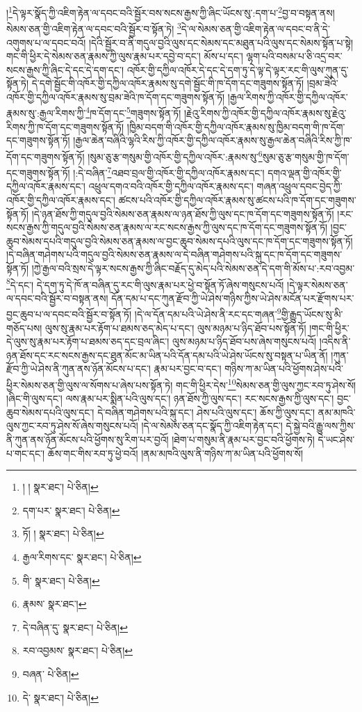 །\footnote{། །  སྣར་ཐང་།  པེ་ཅིན། }དེ་ལྟར་སྣོད་ཀྱི་འཇིག་རྟེན་ལ་དབང་བའི་སྦྱོར་བས་སངས་རྒྱས་ཀྱི་ཞིང་ཡོངས་སུ་:དག་པ་\footnote{དག་པར་  སྣར་ཐང་།  པེ་ཅིན། }བྱ་བ་བསྟན་ནས། སེམས་ཅན་གྱི་འཇིག་རྟེན་ལ་དབང་བའི་སྦྱོར་བ་སྟོན་ཏེ། \footnote{ཏོ། །   སྣར་ཐང་།  པེ་ཅིན། }དེ་ལ་སེམས་ཅན་གྱི་འཇིག་རྟེན་ལ་དབང་བ་ནི་དེ་འགུགས་པ་ལ་དབང་བའོ། །དེའི་སྦྱོར་བ་ནི་གདུལ་བྱའི་ལུས་དང་སེམས་དང་མཐུན་པའི་ལུས་དང་སེམས་སྟོན་པ་སྟེ། གང་གི་ཕྱིར་དེ་སེམས་ཅན་རྣམས་ཀྱི་ལུས་རྣམ་པར་དབྱེ་བ་དང་། མོས་པ་དང་། ལྷག་པའི་བསམ་པ་ཅི་འདྲ་བར་སངས་རྒྱས་ཀྱི་ཞིང་དེ་དང་དེ་དག་དང་། འཁོར་གྱི་དཀྱིལ་འཁོར་དེ་དང་དེ་དག་ཏུ་དེ་ལྟ་དེ་ལྟར་རང་གི་ལུས་ཀུན་དུ་སྟོན་ཏེ། དེ་དགེ་སྦྱོང་གི་འཁོར་གྱི་དཀྱིལ་འཁོར་རྣམས་སུ་དགེ་སྦྱོང་གི་ཁ་དོག་དང་གཟུགས་སྟོན་ཏོ། །བྲམ་ཟེའི་འཁོར་གྱི་དཀྱིལ་འཁོར་རྣམས་སུ་བྲམ་ཟེའི་ཁ་དོག་དང་གཟུགས་སྟོན་ཏོ། །རྒྱལ་རིགས་ཀྱི་འཁོར་གྱི་དཀྱིལ་འཁོར་རྣམས་སུ་:རྒྱལ་རིགས་ཀྱི་\footnote{རྒྱལ་རིགས་དང་  སྣར་ཐང་།  པེ་ཅིན། }ཁ་དོག་དང་\footnote{གི་  སྣར་ཐང་།  པེ་ཅིན། }གཟུགས་སྟོན་ཏོ། །རྗེའུ་རིགས་ཀྱི་འཁོར་གྱི་དཀྱིལ་འཁོར་རྣམས་སུ་རྗེའུ་རིགས་ཀྱི་ཁ་དོག་དང་གཟུགས་སྟོན་ཏོ། །ཁྱིམ་བདག་གི་འཁོར་གྱི་དཀྱིལ་འཁོར་རྣམས་སུ་ཁྱིམ་བདག་གི་ཁ་དོག་དང་གཟུགས་སྟོན་ཏོ། །རྒྱལ་ཆེན་བཞིའི་ལྷའི་རིས་ཀྱི་འཁོར་གྱི་དཀྱིལ་འཁོར་རྣམས་སུ་རྒྱལ་ཆེན་བཞིའི་རིས་ཀྱི་ཁ་དོག་དང་གཟུགས་སྟོན་ཏོ། །སུམ་ཅུ་རྩ་གསུམ་གྱི་འཁོར་གྱི་དཀྱིལ་འཁོར་:རྣམས་སུ་\footnote{རྣམས་  སྣར་ཐང་། }སུམ་ཅུ་རྩ་གསུམ་གྱི་ཁ་དོག་དང་གཟུགས་སྟོན་ཏོ། །:དེ་བཞིན་\footnote{དེ་བཞིན་དུ་  སྣར་ཐང་།  པེ་ཅིན། }འཐབ་བྲལ་གྱི་འཁོར་གྱི་དཀྱིལ་འཁོར་རྣམས་དང་། དགའ་ལྡན་གྱི་འཁོར་གྱི་དཀྱིལ་འཁོར་རྣམས་དང་། འཕྲུལ་དགའ་བའི་འཁོར་གྱི་དཀྱིལ་འཁོར་རྣམས་དང་། གཞན་འཕྲུལ་དབང་བྱེད་ཀྱི་འཁོར་གྱི་དཀྱིལ་འཁོར་རྣམས་དང་། ཚངས་པའི་འཁོར་གྱི་དཀྱིལ་འཁོར་རྣམས་སུ་ཚངས་པའི་ཁ་དོག་དང་གཟུགས་སྟོན་ཏོ། །དེ་ཉན་ཐོས་ཀྱི་གདུལ་བྱའི་སེམས་ཅན་རྣམས་ལ་ཉན་ཐོས་ཀྱི་ལུས་དང་ཁ་དོག་དང་གཟུགས་སྟོན་ཏོ། །རང་སངས་རྒྱས་ཀྱི་གདུལ་བྱའི་སེམས་ཅན་རྣམས་ལ་རང་སངས་རྒྱས་ཀྱི་ལུས་དང་ཁ་དོག་དང་གཟུགས་སྟོན་ཏོ། །བྱང་ཆུབ་སེམས་དཔའི་གདུལ་བྱའི་སེམས་ཅན་རྣམས་ལ་བྱང་ཆུབ་སེམས་དཔའི་ལུས་དང་ཁ་དོག་དང་གཟུགས་སྟོན་ཏོ། །དེ་བཞིན་གཤེགས་པའི་གདུལ་བྱའི་སེམས་ཅན་རྣམས་ལ་དེ་བཞིན་གཤེགས་པའི་སྐུ་དང་ཁ་དོག་དང་གཟུགས་སྟོན་ཏོ། །ཀྱེ་རྒྱལ་བའི་སྲས་དེ་ལྟར་སངས་རྒྱས་ཀྱི་ཞིང་བརྗོད་དུ་མེད་པའི་སེམས་ཅན་དེ་དག་གི་མོས་པ་:རབ་འབྱམ་\footnote{རབ་འབྱམས་  སྣར་ཐང་།  པེ་ཅིན། }དེ་དང་། དེ་དག་ཏུ་དེ་ཁོ་ན་བཞིན་དུ་རང་གི་ལུས་རྣམ་པར་ཕྱེ་བ་སྟོན་ཏོ་ཞེས་གསུངས་པའོ། །དེ་ལྟར་སེམས་ཅན་ལ་དབང་བའི་སྦྱོར་བ་བསྟན་ནས། དོན་དམ་པ་དང་ཀུན་རྫོབ་ཀྱི་ཡེ་ཤེས་གཉིས་ཀྱིས་ཡེ་ཤེས་མངོན་པར་རྫོགས་པར་བྱང་ཆུབ་པ་ལ་དབང་བའི་སྦྱོར་བ་སྟོན་ཏོ། །དེ་ལ་དོན་དམ་པའི་ཡེ་ཤེས་ནི་རང་དང་གཞན་\footnote{བཞན་  པེ་ཅིན། }གྱི་རྒྱུད་ཡོངས་སུ་མི་གཅོད་པས། ལུས་སུ་རྣམ་པར་རྟོག་པ་ཐམས་ཅད་མེད་པ་དང་། ལུས་མཉམ་པ་ཉིད་ཐོབ་པས་སྟོན་ཏོ། །གང་གི་ཕྱིར་དེ་ལུས་སུ་རྣམ་པར་རྟོག་པ་ཐམས་ཅད་དང་བྲལ་ཞིང་། ལུས་མཉམ་པ་ཉིད་ཐོབ་པས་ཞེས་གསུངས་པའོ། །འདིས་ནི་ཉན་ཐོས་དང་རང་སངས་རྒྱས་དང་ཐུན་མོང་མ་ཡིན་པའི་དོན་དམ་པའི་ཡེ་ཤེས་ཡོངས་སུ་བསྟན་པ་ཡིན་ནོ། །ཀུན་རྫོབ་ཀྱི་ཡེ་ཤེས་ནི་ཀུན་ནས་ཉོན་མོངས་པ་དང་། རྣམ་པར་བྱང་བ་དང་། གཉིས་ཀ་མ་ཡིན་པའི་ཕྱོགས་ཤེས་པའི་ཕྱིར་སེམས་ཅན་གྱི་ལུས་ལ་སོགས་པ་ཞེས་པས་སྟོན་ཏེ། གང་གི་ཕྱིར་དེས་\footnote{དེ་  སྣར་ཐང་།  པེ་ཅིན། }སེམས་ཅན་གྱི་ལུས་ཀྱང་རབ་ཏུ་ཤེས་སོ། །ཞིང་གི་ལུས་དང་། ལས་རྣམ་པར་སྨིན་པའི་ལུས་དང་། ཉན་ཐོས་ཀྱི་ལུས་དང་། རང་སངས་རྒྱས་ཀྱི་ལུས་དང་། བྱང་ཆུབ་སེམས་དཔའི་ལུས་དང་། དེ་བཞིན་གཤེགས་པའི་སྐུ་དང་། ཤེས་པའི་ལུས་དང་། ཆོས་ཀྱི་ལུས་དང་། ནམ་མཁའི་ལུས་ཀྱང་རབ་ཏུ་ཤེས་སོ་ཞེས་གསུངས་པའོ། །དེ་ལ་སེམས་ཅན་དང་སྣོད་ཀྱི་འཇིག་རྟེན་དང་། དེ་སྐྱེ་བའི་རྒྱུ་ལས་ཀྱིས་ནི་ཀུན་ནས་ཉོན་མོངས་པའི་ཕྱོགས་སུ་རིག་པར་བྱའོ། །ཐེག་པ་གསུམ་ནི་རྣམ་པར་བྱང་བའི་ཕྱོགས་ཏེ། དེ་ཡང་ཤེས་པ་གང་དང་། ཆོས་གང་གིས་རབ་ཏུ་ཕྱེ་བའོ། །ནམ་མཁའི་ལུས་ནི་གཉིས་ཀ་མ་ཡིན་པའི་ཕྱོགས་སོ། 